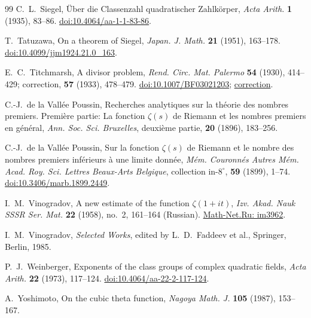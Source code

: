 \documentclass[11pt,a4paper]{article}
\numberwithin{equation}{section}
\numberwithin{figure}{section}
\theoremstyle{definition}
\theoremstyle{remark}
\begin{document}
\begin{thebibliography}{99}
C.~L.~Siegel,
\"Uber die Classenzahl quadratischer Zahlk\"orper,
\emph{Acta Arith.} \textbf{1} (1935), 83--86.
\href{https://doi.org/10.4064/aa-1-1-83-86}
{doi:10.4064/aa-1-1-83-86}.

{\raggedright
T.~Tatuzawa,
On a theorem of Siegel,
\emph{Japan. J. Math.} \textbf{21} (1951), 163--178.
\href{https://doi.org/10.4099/jjm1924.21.0_163}
{doi:10.4099/jjm1924.21.0\_163}.
\par}

E.~C.~Titchmarsh,
A divisor problem,
\emph{Rend. Circ. Mat. Palermo} \textbf{54} (1930), 414--429;
correction, \textbf{57} (1933), 478--479.
\href{https://doi.org/10.1007/BF03021203}{doi:10.1007/BF03021203};
\href{https://doi.org/10.1007/BF03017588}{correction}.

C.-J.~de la Vall\'ee Poussin,
Recherches analytiques sur la th\'eorie des nombres premiers.
Premi\`ere partie: La fonction $\zeta(s)$ de Riemann et les
nombres premiers en g\'en\'eral,
\emph{Ann. Soc. Sci. Bruxelles}, deuxi\`eme partie,
\textbf{20} (1896), 183--256.

C.-J.~de la Vall\'ee Poussin,
Sur la fonction $\zeta(s)$ de Riemann et le nombre des nombres
premiers inf\'erieurs \`a une limite donn\'ee,
\emph{M\'em. Couronn\'es Autres M\'em. Acad. Roy. Sci.
Lettres Beaux-Arts Belgique}, collection in-$8^\circ$,
\textbf{59} (1899), 1--74.
\href{https://doi.org/10.3406/marb.1899.2449}
{doi:10.3406/marb.1899.2449}.

I.~M.~Vinogradov,
A new estimate of the function $\zeta(1+it)$,
\emph{Izv. Akad. Nauk SSSR Ser. Mat.} \textbf{22} (1958),
no.~2, 161--164 (Russian).
\href{https://www.mathnet.ru/eng/im3962}{Math-Net.Ru: im3962}.

I.~M.~Vinogradov,
\emph{Selected Works}, edited by L.~D.~Faddeev et al.,
Springer, Berlin, 1985.

P.~J.~Weinberger,
Exponents of the class groups of complex quadratic fields,
\emph{Acta Arith.} \textbf{22} (1973), 117--124.
\href{https://doi.org/10.4064/aa-22-2-117-124}{doi:10.4064/aa-22-2-117-124}.

A.~Yoshimoto,
On the cubic theta function,
\emph{Nagoya Math. J.} \textbf{105} (1987), 153--167.

\end{thebibliography}
\end{document}
